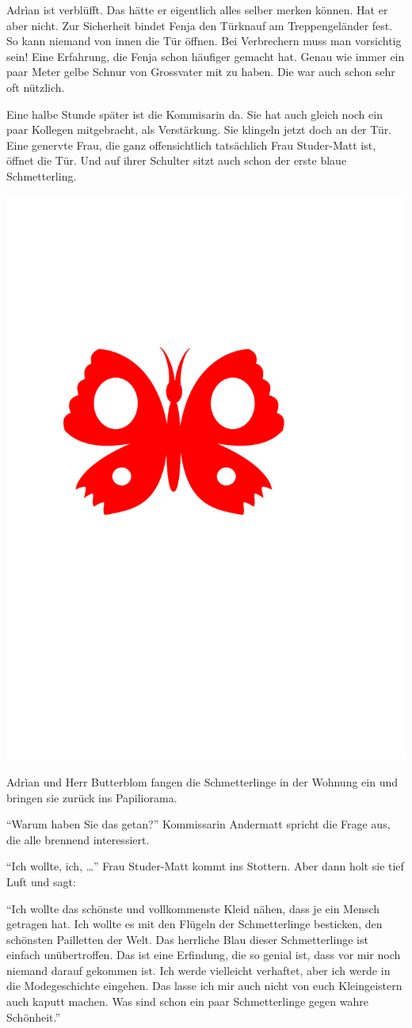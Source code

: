 Adrìan ist verblüfft. Das hätte er eigentlich alles selber merken können. Hat er aber nicht. Zur Sicherheit bindet Fenja den Türknauf am Treppengeländer fest. So kann niemand von innen die Tür öffnen. Bei Verbrechern muss man vorsichtig sein! Eine Erfahrung, die Fenja schon häufiger gemacht hat. Genau wie immer ein paar Meter gelbe Schnur von Grossvater mit zu haben. Die war auch schon sehr oft nützlich. 

Eine halbe Stunde später ist die Kommisarin da. Sie hat auch gleich noch ein paar Kollegen mitgebracht, als Verstärkung. Sie klingeln jetzt doch an der Tür. Eine genervte Frau, die ganz offensichtlich tatsächlich Frau Studer-Matt ist, öffnet die Tür. Und auf ihrer Schulter sitzt auch schon der erste blaue Schmetterling.
\begin{center}
\includegraphics[width=.05\textwidth]{bilder/inkling.pdf}
\end{center}
Adrìan und Herr Butterblom fangen die Schmetterlinge in der Wohnung ein und bringen sie zurück ins Papiliorama. 

\enquote{Warum haben Sie das getan?} Kommissarin Andermatt spricht die Frage aus, die alle brennend interessiert.

\enquote{Ich wollte, ich, \dots} Frau Studer-Matt kommt ins Stottern. Aber dann holt sie tief Luft und sagt: 

\enquote{Ich wollte das schönste und vollkommenste Kleid nähen, dass je ein Mensch getragen hat. Ich wollte es mit den Flügeln der Schmetterlinge besticken, den schönsten Pailletten der Welt. Das herrliche Blau dieser Schmetterlinge ist einfach unübertroffen. Das ist eine Erfindung, die so genial ist, dass vor mir noch niemand darauf gekommen ist. Ich werde vielleicht verhaftet, aber ich werde in die Modegeschichte eingehen. Das lasse ich mir auch nicht von euch Kleingeistern auch kaputt machen. Was sind schon ein paar Schmetterlinge gegen wahre Schönheit.}

